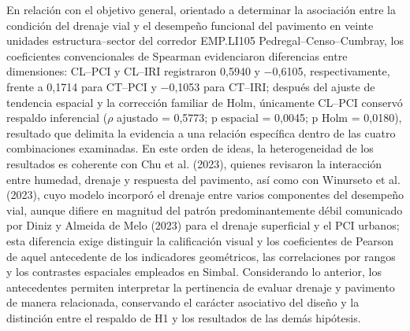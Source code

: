 \begingroup
\setlength{\emergencystretch}{2em}

En relación con el objetivo general, orientado a determinar la asociación entre la condición del drenaje vial y el desempeño funcional del pavimento en veinte unidades estructura--sector del corredor EMP.LI105 Pedregal--Censo--Cumbray, los coeficientes convencionales de Spearman evidenciaron diferencias entre dimensiones: CL--PCI y CL--IRI registraron 0,5940 y $-$0,6105, respectivamente, frente a 0,1714 para CT--PCI y $-$0,1053 para CT--IRI; después del ajuste de tendencia espacial y la corrección familiar de Holm, únicamente CL--PCI conservó respaldo inferencial ($\rho$ ajustado = 0,5773; p espacial = 0,0045; p Holm = 0,0180), resultado que delimita la evidencia a una relación específica dentro de las cuatro combinaciones examinadas. En este orden de ideas, la heterogeneidad de los resultados es coherente con Chu et al. (2023), quienes revisaron la interacción entre humedad, drenaje y respuesta del pavimento, así como con Winurseto et al. (2023), cuyo modelo incorporó el drenaje entre varios componentes del desempeño vial, aunque difiere en magnitud del patrón predominantemente débil comunicado por Diniz y Almeida de Melo (2023) para el drenaje superficial y el PCI urbanos; esta diferencia exige distinguir la calificación visual y los coeficientes de Pearson de aquel antecedente de los indicadores geométricos, las correlaciones por rangos y los contrastes espaciales empleados en Simbal. Considerando lo anterior, los antecedentes permiten interpretar la pertinencia de evaluar drenaje y pavimento de manera relacionada, conservando el carácter asociativo del diseño y la distinción entre el respaldo de H1 y los resultados de las demás hipótesis.

